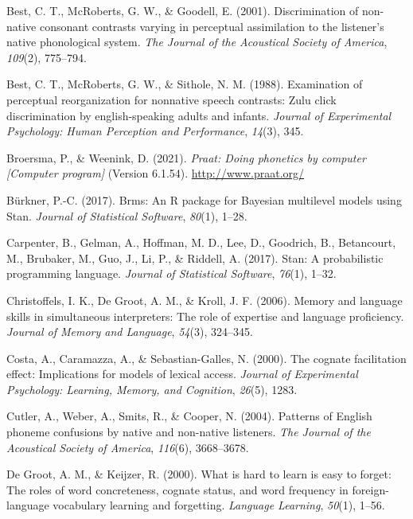 \documentclass[
]{article}
\newlength{\cslhangindent}
\newenvironment{CSLReferences}[2] %
 {\begin{list}{}{%
  \setlength{\itemindent}{0pt}
  \setlength{\leftmargin}{0pt}
  \setlength{\parsep}{0pt}
  \ifodd #1
   \setlength{\leftmargin}{\cslhangindent}
   \setlength{\itemindent}{-1\cslhangindent}
  \fi
  \setlength{\itemsep}{#2\baselineskip}}}
 {\end{list}}
\begin{document}
\label{refs}
\begin{CSLReferences}{1}{0}
Best, C. T., McRoberts, G. W., \& Goodell, E. (2001). Discrimination of
non-native consonant contrasts varying in perceptual assimilation to the
listener's native phonological system. \emph{The Journal of the
Acoustical Society of America}, \emph{109}(2), 775--794.

Best, C. T., McRoberts, G. W., \& Sithole, N. M. (1988). Examination of
perceptual reorganization for nonnative speech contrasts: Zulu click
discrimination by english-speaking adults and infants. \emph{Journal of
Experimental Psychology: Human Perception and Performance},
\emph{14}(3), 345.

Broersma, P., \& Weenink, D. (2021). \emph{Praat: Doing phonetics by
computer {[}{Computer} program{]}} (Version 6.1.54).
\url{http://www.praat.org/}

Bürkner, P.-C. (2017). Brms: {An R} package for {Bayesian} multilevel
models using {Stan}. \emph{Journal of Statistical Software},
\emph{80}(1), 1--28.

Carpenter, B., Gelman, A., Hoffman, M. D., Lee, D., Goodrich, B.,
Betancourt, M., Brubaker, M., Guo, J., Li, P., \& Riddell, A. (2017).
Stan: {A} probabilistic programming language. \emph{Journal of
Statistical Software}, \emph{76}(1), 1--32.

Christoffels, I. K., De Groot, A. M., \& Kroll, J. F. (2006). Memory and
language skills in simultaneous interpreters: {The} role of expertise
and language proficiency. \emph{Journal of Memory and Language},
\emph{54}(3), 324--345.

Costa, A., Caramazza, A., \& Sebastian-Galles, N. (2000). The cognate
facilitation effect: Implications for models of lexical access.
\emph{Journal of Experimental Psychology: Learning, Memory, and
Cognition}, \emph{26}(5), 1283.

Cutler, A., Weber, A., Smits, R., \& Cooper, N. (2004). Patterns of
{English} phoneme confusions by native and non-native listeners.
\emph{The Journal of the Acoustical Society of America}, \emph{116}(6),
3668--3678.

De Groot, A. M., \& Keijzer, R. (2000). What is hard to learn is easy to
forget: The roles of word concreteness, cognate status, and word
frequency in foreign-language vocabulary learning and forgetting.
\emph{Language Learning}, \emph{50}(1), 1--56.


\end{CSLReferences}
\end{document}
